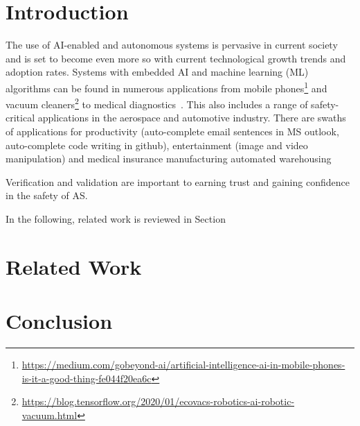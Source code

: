 \section{Introduction}


The use of AI-enabled and autonomous systems is pervasive in current society and is set to become even more so with current technological growth trends and adoption rates. Systems with embedded AI and machine learning (ML) algorithms can be found in numerous applications from mobile phones\footnote{\url{https://medium.com/gobeyond-ai/artificial-intelligence-ai-in-mobile-phones-is-it-a-good-thing-fe044f20ea6c}} and vacuum cleaners\footnote{\url{https://blog.tensorflow.org/2020/01/ecovacs-robotics-ai-robotic-vacuum.html}} to medical diagnostics~\cite{kononenko2001machine}. 
%
This also includes a range of safety-critical applications in the aerospace and automotive industry. 
%
There are swaths of applications for productivity (auto-complete email sentences in MS outlook, auto-complete code writing in github), entertainment (image and video manipulation) and 
medical
insurance
manufacturing
automated warehousing


Verification and validation are important to earning trust and gaining confidence in the safety of AS. 



In the following, related work is reviewed in Section




\section{Related Work}
\label{Related_work}



\section{Conclusion}\label{conclusion}
